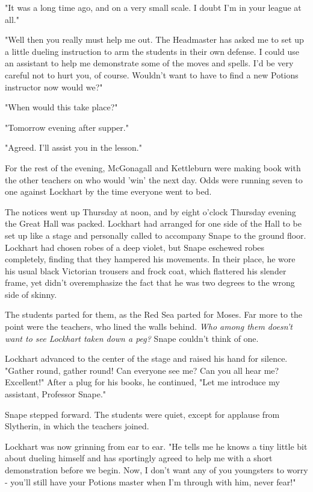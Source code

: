\documentclass[a4paper,11pt]{article}
\begin{document}
"It was a long time ago, and on a very small scale. I doubt I'm in your league at all."

"Well then you really must help me out. The Headmaster has asked me to set up a little dueling instruction to arm the students in their own defense. I could use an assistant to help me demonstrate some of the moves and spells. I'd be very careful not to hurt you, of course. Wouldn't want to have to find a new Potions instructor now would we?"

"When would this take place?"

"Tomorrow evening after supper."

"Agreed. I'll assist you in the lesson."

For the rest of the evening, McGonagall and Kettleburn were making book with the other teachers on who would 'win' the next day. Odds were running seven to one against Lockhart by the time everyone went to bed.

The notices went up Thursday at noon, and by eight o'clock Thursday evening the Great Hall was packed. Lockhart had arranged for one side of the Hall to be set up like a stage and personally called to accompany Snape to the ground floor. Lockhart had chosen robes of a deep violet, but Snape eschewed robes completely, finding that they hampered his movements. In their place, he wore his usual black Victorian trousers and frock coat, which flattered his slender frame, yet didn't overemphasize the fact that he was two degrees to the wrong side of skinny.

The students parted for them, as the Red Sea parted for Moses. Far more to the point were the teachers, who lined the walls behind. \emph{Who among them doesn't want to see Lockhart taken down a peg?} Snape couldn't think of one.

Lockhart advanced to the center of the stage and raised his hand for silence. "Gather round, gather round! Can everyone see me? Can you all hear me? Excellent!" After a plug for his books, he continued, "Let me introduce my assistant, Professor Snape."

Snape stepped forward. The students were quiet, except for applause from Slytherin, in which the teachers joined.

Lockhart was now grinning from ear to ear. "He tells me he knows a tiny little bit about dueling himself and has sportingly agreed to help me with a short demonstration before we begin. Now, I don't want any of you youngsters to worry - you'll still have your Potions master when I'm through with him, never fear!"
\end{document}
